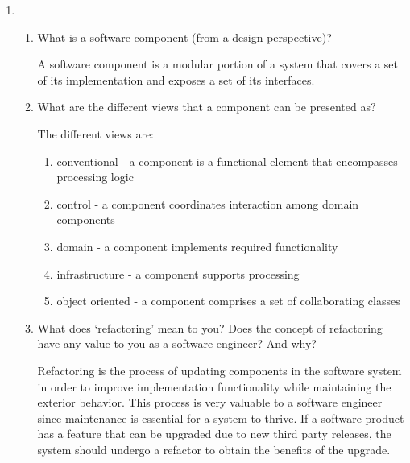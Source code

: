 \documentclass[12pt]{article}
\begin{document}
\begin{enumerate}


    \item
    \begin{enumerate}[start=1,align=left]

      \item What is a software component (from a design perspective)?

      A software component is a modular portion of a system that covers a set of its implementation and exposes a set of its interfaces.

      \item What are the different views that a component can be presented as? 

      The different views are:
      \begin{enumerate}
        \item conventional - a component is a functional element that encompasses processing logic
        \item control - a component coordinates interaction among domain components
        \item domain - a component implements required functionality
        \item infrastructure - a component supports processing
        \item object oriented - a component comprises a set of collaborating classes
      \end{enumerate}

      \item What does ‘refactoring’ mean to you? Does the concept of refactoring have any value to you as a software engineer? And why? 

      Refactoring is the process of updating components in the software system in order to improve implementation functionality while maintaining the exterior behavior. This process is very valuable to a software engineer since maintenance is essential for a system to thrive. If a software product has a feature that can be upgraded due to new third party releases, the system should undergo a refactor to obtain the benefits of the upgrade.


\end{enumerate}
\end{enumerate}
\end{document}
